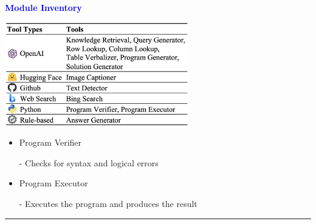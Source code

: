 \documentclass[professionalfont]{beamer}
\begin{document}
\begin{frame}
\begin{refsection}

\begin{center}
    { \textbf{\textcolor{blue}{ {\fontsize{12}{14}\selectfont Module Inventory} }} }
\end{center}

\begin{center}
    \includegraphics[width=0.6\textwidth]{table/2.png}
\end{center}

\begin{itemize}
    \item Program Verifier

    - Checks for syntax and logical errors \cite{self-refine}

    \item Program Executor

    - Executes the program and produces the result
\end{itemize}

\vspace{0.3cm}
\hrule
\printbibliography

\end{refsection}
\end{frame}
\end{document}
